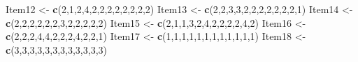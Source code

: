 \documentclass[
  english,
]{book}
\newenvironment{Shaded}{\begin{snugshade}}{\end{snugshade}}
\newcommand{\DecValTok}[1]{\textcolor[rgb]{0.00,0.00,0.81}{#1}}
\newcommand{\KeywordTok}[1]{\textcolor[rgb]{0.13,0.29,0.53}{\textbf{#1}}}
\newcommand{\NormalTok}[1]{#1}
\newcommand{\StringTok}[1]{\textcolor[rgb]{0.31,0.60,0.02}{#1}}
\begin{document}
\begin{Shaded}
\begin{Highlighting}[]
\NormalTok{Item12 <-}\StringTok{ }\KeywordTok{c}\NormalTok{(}\DecValTok{2}\NormalTok{,}\DecValTok{1}\NormalTok{,}\DecValTok{2}\NormalTok{,}\DecValTok{4}\NormalTok{,}\DecValTok{2}\NormalTok{,}\DecValTok{2}\NormalTok{,}\DecValTok{2}\NormalTok{,}\DecValTok{2}\NormalTok{,}\DecValTok{2}\NormalTok{,}\DecValTok{2}\NormalTok{,}\DecValTok{2}\NormalTok{,}\DecValTok{2}\NormalTok{)}
\NormalTok{Item13 <-}\StringTok{ }\KeywordTok{c}\NormalTok{(}\DecValTok{2}\NormalTok{,}\DecValTok{2}\NormalTok{,}\DecValTok{3}\NormalTok{,}\DecValTok{3}\NormalTok{,}\DecValTok{2}\NormalTok{,}\DecValTok{2}\NormalTok{,}\DecValTok{2}\NormalTok{,}\DecValTok{2}\NormalTok{,}\DecValTok{2}\NormalTok{,}\DecValTok{2}\NormalTok{,}\DecValTok{2}\NormalTok{,}\DecValTok{1}\NormalTok{)}
\NormalTok{Item14 <-}\StringTok{ }\KeywordTok{c}\NormalTok{(}\DecValTok{2}\NormalTok{,}\DecValTok{2}\NormalTok{,}\DecValTok{2}\NormalTok{,}\DecValTok{2}\NormalTok{,}\DecValTok{2}\NormalTok{,}\DecValTok{2}\NormalTok{,}\DecValTok{3}\NormalTok{,}\DecValTok{2}\NormalTok{,}\DecValTok{2}\NormalTok{,}\DecValTok{2}\NormalTok{,}\DecValTok{2}\NormalTok{,}\DecValTok{2}\NormalTok{)}
\NormalTok{Item15 <-}\StringTok{ }\KeywordTok{c}\NormalTok{(}\DecValTok{2}\NormalTok{,}\DecValTok{1}\NormalTok{,}\DecValTok{1}\NormalTok{,}\DecValTok{3}\NormalTok{,}\DecValTok{2}\NormalTok{,}\DecValTok{4}\NormalTok{,}\DecValTok{2}\NormalTok{,}\DecValTok{2}\NormalTok{,}\DecValTok{2}\NormalTok{,}\DecValTok{2}\NormalTok{,}\DecValTok{4}\NormalTok{,}\DecValTok{2}\NormalTok{)}
\NormalTok{Item16 <-}\StringTok{ }\KeywordTok{c}\NormalTok{(}\DecValTok{2}\NormalTok{,}\DecValTok{2}\NormalTok{,}\DecValTok{2}\NormalTok{,}\DecValTok{4}\NormalTok{,}\DecValTok{4}\NormalTok{,}\DecValTok{2}\NormalTok{,}\DecValTok{2}\NormalTok{,}\DecValTok{2}\NormalTok{,}\DecValTok{4}\NormalTok{,}\DecValTok{2}\NormalTok{,}\DecValTok{2}\NormalTok{,}\DecValTok{1}\NormalTok{)}
\NormalTok{Item17 <-}\StringTok{ }\KeywordTok{c}\NormalTok{(}\DecValTok{1}\NormalTok{,}\DecValTok{1}\NormalTok{,}\DecValTok{1}\NormalTok{,}\DecValTok{1}\NormalTok{,}\DecValTok{1}\NormalTok{,}\DecValTok{1}\NormalTok{,}\DecValTok{1}\NormalTok{,}\DecValTok{1}\NormalTok{,}\DecValTok{1}\NormalTok{,}\DecValTok{1}\NormalTok{,}\DecValTok{1}\NormalTok{,}\DecValTok{1}\NormalTok{)}
\NormalTok{Item18 <-}\StringTok{ }\KeywordTok{c}\NormalTok{(}\DecValTok{3}\NormalTok{,}\DecValTok{3}\NormalTok{,}\DecValTok{3}\NormalTok{,}\DecValTok{3}\NormalTok{,}\DecValTok{3}\NormalTok{,}\DecValTok{3}\NormalTok{,}\DecValTok{3}\NormalTok{,}\DecValTok{3}\NormalTok{,}\DecValTok{3}\NormalTok{,}\DecValTok{3}\NormalTok{,}\DecValTok{3}\NormalTok{,}\DecValTok{3}\NormalTok{)}

\end{Highlighting}
\end{Shaded}
\end{document}
